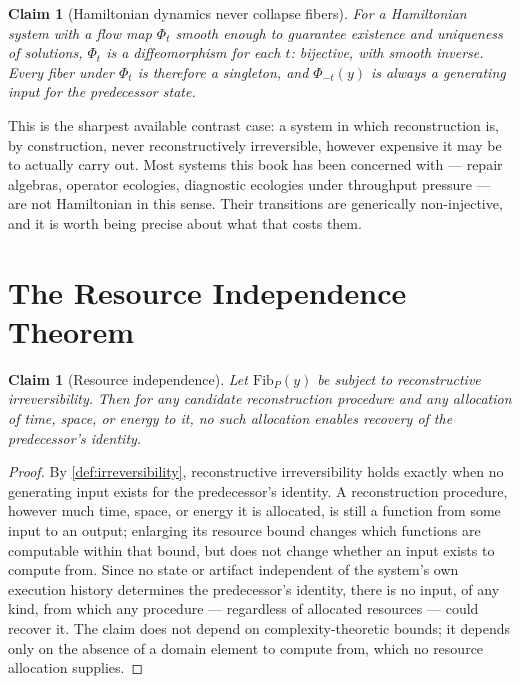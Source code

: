 \documentclass[12pt]{report}
\newtheorem{claim}[definition]{Claim}
\begin{document}
\begin{claim}[Hamiltonian dynamics never collapse fibers]
\label{cor:hamiltonian-recall}
For a Hamiltonian system with a flow map $\Phi_t$ smooth enough to
guarantee existence and uniqueness of solutions, $\Phi_t$ is a
diffeomorphism for each $t$: bijective, with smooth inverse. Every fiber
under $\Phi_t$ is therefore a singleton, and $\Phi_{-t}(y)$ is always a
generating input for the predecessor state.
\end{claim}

This is the sharpest available contrast case: a system in which
reconstruction is, by construction, never reconstructively irreversible,
however expensive it may be to actually carry out. Most systems this
book has been concerned with --- repair algebras, operator ecologies,
diagnostic ecologies under throughput pressure --- are not Hamiltonian in
this sense. Their transitions are generically non-injective, and it is
worth being precise about what that costs them.

\section{The Resource Independence Theorem}
\label{sec:resource-independence}

\begin{claim}[Resource independence]
\label{thm:resource-independence}
Let $\mathrm{Fib}_P(y)$ be subject to reconstructive irreversibility.
Then for any candidate reconstruction procedure and any allocation of
time, space, or energy to it, no such allocation enables recovery of the
predecessor's identity.
\end{claim}

\begin{proof}
By \cref{def:irreversibility}, reconstructive irreversibility holds
exactly when no generating input exists for the predecessor's identity.
A reconstruction procedure, however much time, space, or energy it is
allocated, is still a function from some input to an output; enlarging
its resource bound changes which functions are computable within that
bound, but does not change whether an input exists to compute from.
Since no state or artifact independent of the system's own execution
history determines the predecessor's identity, there is no input, of any
kind, from which any procedure --- regardless of allocated resources ---
could recover it. The claim does not depend on complexity-theoretic
bounds; it depends only on the absence of a domain element to compute
from, which no resource allocation supplies.
\end{proof}
\end{document}
